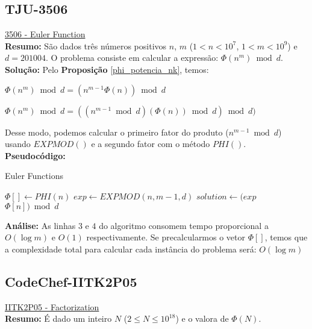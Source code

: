 \subsection{TJU-3506}
\href{http://acm.tju.edu.cn/toj/showp3506.html}{3506 - Euler Function} \\

\textbf{Resumo:}
São dados três números positivos $n$, $m$ ($1 < n < 10^7$, $1 < m < 10^9$) e $d = 201004$.
O problema consiste em calcular a expressão: $\Phi(n^m) \bmod d$.
\\

\textbf{Solução:}
Pelo \textbf{Proposição} \autoref{phi_potencia_nk}, temos: 

$\Phi(n^m) \bmod d = (n^{m-1}\Phi(n)) \bmod d$

$\Phi(n^m) \bmod d = ((n^{m-1} \bmod d)(\Phi(n)) \bmod d) \bmod d)$

Desse modo, podemos calcular o primeiro fator do produto ($n^{m-1} \bmod d$) usando $EXPMOD()$ e a segundo fator com o método $PHI()$.
\\

\textbf{Pseudocódigo:}
\begin{algorithm}
\caption{Euler Functions}
\begin{algorithmic}[1]
\State $\Phi[] \gets PHI(n)$
\State $exp \gets EXPMOD(n, m-1, d)$
\State $solution \gets (exp$ $\Phi[n]) \bmod d$
\State {}
\EndProcedure
\end{algorithmic}
\end{algorithm}

\textbf{Análise:}
As linhas $3$ e $4$ do algoritmo consomem tempo proporcional a $O(\log m)$ e $O(1)$ respectivamente.
Se precalcularmos o vetor $\Phi[]$, temos que a complexidade total para calcular cada instância do problema será: $O(\log m)$ 



\subsection{CodeChef-IITK2P05}
\href{https://www.codechef.com/problems/IITK2P05}{IITK2P05 - Factorization}\\

\textbf{Resumo:}
É dado um inteiro $N$ ($2 \leq N \leq 10^{18}$) e o valora de $\Phi(N)$.


